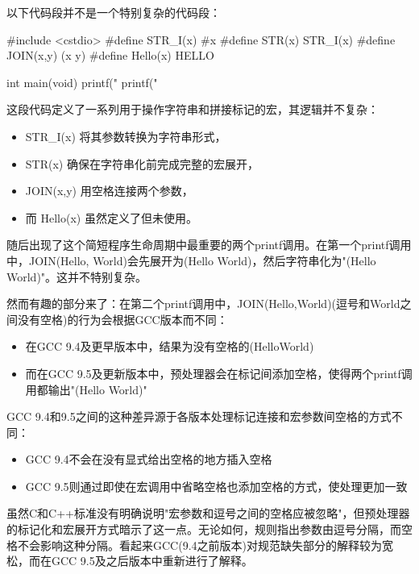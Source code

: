 
以下代码段并不是一个特别复杂的代码段：

\begin{cpp}
#include <cstdio>
#define STR_I(x) #x
#define STR(x) STR_I(x)
#define JOIN(x,y) (x y)
#define Hello(x) HELLO

int main(void){
  printf("%
  printf("%
}
\end{cpp}

这段代码定义了一系列用于操作字符串和拼接标记的宏，其逻辑并不复杂：

\begin{itemize}
\item 
STR\_I(x) 将其参数转换为字符串形式，

\item 
STR(x) 确保在字符串化前完成完整的宏展开，

\item 
JOIN(x,y) 用空格连接两个参数，

\item 
而 Hello(x) 虽然定义了但未使用。
\end{itemize}

随后出现了这个简短程序生命周期中最重要的两个printf调用。在第一个printf调用中，JOIN(Hello, World)会先展开为(Hello World)，然后字符串化为"(Hello World)"。这并不特别复杂。

然而有趣的部分来了：在第二个printf调用中，JOIN(Hello,World)(逗号和World之间没有空格)的行为会根据GCC版本而不同：

\begin{itemize}
\item 
在GCC 9.4及更早版本中，结果为没有空格的(HelloWorld)

\item 
而在GCC 9.5及更新版本中，预处理器会在标记间添加空格，使得两个printf调用都输出"(Hello World)"
\end{itemize}

GCC 9.4和9.5之间的这种差异源于各版本处理标记连接和宏参数间空格的方式不同：

\begin{itemize}
\item 
GCC 9.4不会在没有显式给出空格的地方插入空格

\item 
GCC 9.5则通过即使在宏调用中省略空格也添加空格的方式，使处理更加一致
\end{itemize}

虽然C和C++标准没有明确说明"宏参数和逗号之间的空格应被忽略"，但预处理器的标记化和宏展开方式暗示了这一点。无论如何，规则指出参数由逗号分隔，而空格不会影响这种分隔。看起来GCC(9.4之前版本)对规范缺失部分的解释较为宽松，而在GCC 9.5及之后版本中重新进行了解释。

